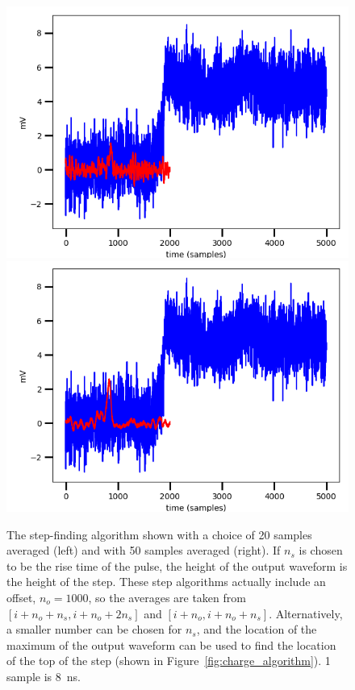  \begin{figure}[htbp]
\begin{center}
\includegraphics[width =\halffig ]{figures/testbed/figure_q20.png}
\includegraphics[width =\halffig ]{figures/testbed/figure_q50.png}
\caption{The step-finding algorithm shown with a choice of 20 samples averaged (left) and with 50 samples averaged (right). If $n_{s}$ is chosen to be the rise time of the pulse, the height of the output waveform is the height of the step. These step algorithms actually include an offset, $n_{o}=1000$, so the averages are taken from $[i+n_{o}+n_{s},i+n_{o}+2n_{s}]$ and $[i+n_{o},i+n_{o}+n_{s}]$. Alternatively, a smaller number can be chosen for $n_{s}$, and the location of the maximum of the output waveform can be used to find the location of the top of the step (shown in Figure~\ref{fig:charge_algorithm}). 1 sample is 8~ns. }
\label{fig:nsamp_choice}
\end{center}
\end{figure}

